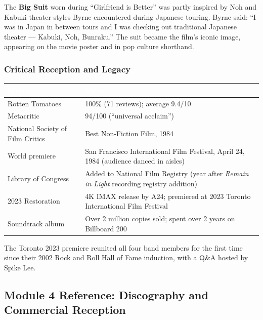 \documentclass[11pt,letterpaper]{article}
\newcommand{\tableheader}[1]{\textbf{\sffamily\textcolor{white}{#1}}}
\begin{document}
The \textbf{Big Suit} worn during ``Girlfriend is Better'' was partly inspired by Noh and Kabuki theater styles Byrne encountered during Japanese touring. Byrne said: ``I was in Japan in between tours and I was checking out traditional Japanese theater --- Kabuki, Noh, Bunraku.'' The suit became the film's iconic image, appearing on the movie poster and in pop culture shorthand.

\subsubsection{Critical Reception and Legacy}

\begin{center}
\begin{tabularx}{\textwidth}{L{4cm}X}
\toprule
{}
\tableheader{Metric} & \tableheader{Value} \\
\midrule
Rotten Tomatoes & 100\% (71 reviews); average 9.4/10 \\
Metacritic & 94/100 (``universal acclaim'') \\
National Society of Film Critics & Best Non-Fiction Film, 1984 \\
World premiere & San Francisco International Film Festival, April 24, 1984 (audience danced in aisles) \\
Library of Congress & Added to National Film Registry (year after \textit{Remain in Light} recording registry addition) \\
2023 Restoration & 4K IMAX release by A24; premiered at 2023 Toronto International Film Festival \\
Soundtrack album & Over 2 million copies sold; spent over 2 years on Billboard 200 \\
\bottomrule
\end{tabularx}
\end{center}

The Toronto 2023 premiere reunited all four band members for the first time since their 2002 Rock and Roll Hall of Fame induction, with a Q\&A hosted by Spike Lee.

\subsection{Module 4 Reference: Discography and Commercial Reception}
\end{document}
